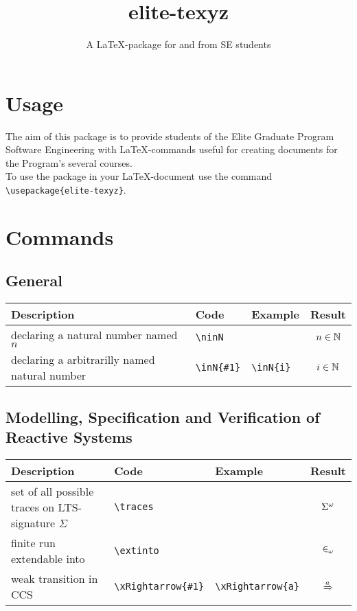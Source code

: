 \documentclass{scrartcl}
\title{elite-texyz}
\subtitle{A \LaTeX -package for and from SE students}
\date{}
\begin{document}
\maketitle

\newpage

\tableofcontents

\newpage

\section{Usage}
The aim of this package is to provide students of the Elite Graduate Program Software Engineering with \LaTeX -commands useful for creating documents for the Program's several courses.\\
\medskip
To use the package in your \LaTeX -document use the command \verb|\usepackage{elite-texyz}|.

\section{Commands}
\subsection{General}
\begin{tabular}{p{7cm}|l|l|c}
	\hline
	Description & Code & Example & Result\\
	\hline
	declaring a natural number named $n$ & \verb|\ninN| & & $n\in\mathbb{N}$ \\
	declaring a arbitrarilly named natural number & \verb|\inN{#1}| & \verb|\inN{i}| & $i\in\mathbb{N}$ \\
	\hline
\end{tabular}

\subsection{Modelling, Specification and Verification of Reactive Systems}
\begin{tabular}{p{7cm}|l|l|c}
	\hline
	Description & Code & Example & Result\\
	\hline
	set of all possible traces on LTS-signature $\Sigma$ & \verb|\traces| & & $\Sigma^\omega$ \\
	finite run extendable into & \verb|\extinto| & & $\in_\omega$ \\
	weak transition in CCS & \verb|\xRightarrow{#1}| & \verb|\xRightarrow{a}| & $\xRightarrow{a}$ \\
	\hline
\end{tabular}
\end{document}
